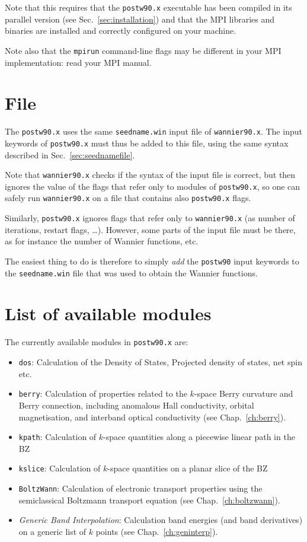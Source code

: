 Note that this requires that the {\tt postw90.x} executable has been
compiled in its parallel version (see Sec.~\ref{sec:installation}) and
that the MPI libraries and binaries are installed and correctly
configured on your machine.

Note also that the {\tt mpirun} command-line flags may be different in your MPI implementation: read your MPI manual.


\section{ File}
The \texttt{postw90.x} uses the same \texttt{seedname.win} input file
of \texttt{wannier90.x}. The input keywords of \texttt{postw90.x} must
thus be added to this file, using the same syntax described in
Sec.~\ref{sec:seednamefile}. 

Note that \texttt{wannier90.x} checks if the syntax of the input file
is correct, but then ignores the value of the flags that refer only to
modules of \texttt{postw90.x}, so one can safely run
\texttt{wannier90.x} on a file that contains also \texttt{postw90.x}
flags.

Similarly, \texttt{postw90.x} ignores flags that refer only to
\texttt{wannier90.x} (as number of iterations, restart flags,
\ldots). However, some parts of the input file must be there, as for
instance the number of Wannier functions, etc.

The easiest thing to do
is therefore to simply \emph{add} the \texttt{postw90} input keywords to
the \texttt{seedname.win} file that was used
to obtain the Wannier functions.

\section{List of available modules}
The currently available modules in \texttt{postw90.x} are:
\begin{itemize}
\item \texttt{dos}: Calculation of the Density of States, Projected
  density of states, net spin etc.
\item \texttt{berry}: Calculation of properties related to the
  $k$-space Berry curvature and Berry connection, including anomalous
  Hall conductivity, orbital magnetisation, and interband optical
  conductivity (see Chap.~\ref{ch:berry}).
\item \texttt{kpath}: Calculation of $k$-space quantities along a
  piecewise linear path in the BZ
\item \texttt{kslice}: Calculation of $k$-space quantities on a planar
  slice of the BZ
\item \texttt{BoltzWann}: Calculation of electronic transport
  properties using the semiclassical Boltzmann transport equation (see Chap.~\ref{ch:boltzwann}).
\item \emph{Generic Band Interpolation}: Calculation band energies (and band
  derivatives) on a generic list of $k$ points (see Chap.~\ref{ch:geninterp}).
\end{itemize}


